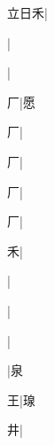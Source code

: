 \begin{multicols}{2}
{{\cjk{}立日禾}|{}\par
{\cjk{}{\cnsym{}　}{\cnsym{}　}{\cnsym{}　}}|{}\par
{\cjk{}{\cnsym{}　}{\cnsym{}　}{\cnsym{}　}}|{}\par
{\cjk{}{\cnsym{}　}{\cnsym{}　}厂}|{\cjk{}愿}\par
{厂}|{}\par
{厂}|{}\par
{\cjk{}{\cnsym{}　}{\cnsym{}　}厂}|{}\par
{\cjk{}{\cnsym{}　}{\cnsym{}　}厂}|{}\par
{\cjk{}{\cnsym{}　}{\cnsym{}　}禾}|{}\par
{\cjk{}{\cnsym{}　}{\cnsym{}　}{\cnsym{}　}}|{}\par
{\cjk{}{\cnsym{}　}{\cnsym{}　}{\cnsym{}　}}|{}\par
{\cjk{}{\cnsym{}　}{\cnsym{}　}{\cnsym{}　}}|{}\par
{\cjk{}{\cnsym{}　}{\cnsym{}　}{\cnsym{}　}}|{\cjk{}泉}\par
{\cjk{}{\cnsym{}　}{\cnsym{}　}王}|{\cjk{}瑔}\par
{\cjk{}{\cnsym{}　}{\cnsym{}　}井}|{}\par
}
\end{multicols}
